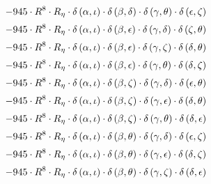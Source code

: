 \begin{subequations}
\begin{gather}
 \\[0.2em] \notag 		 - 945 \cdot R^{8} \cdot R_{\eta{}} \cdot \delta{}\left(\alpha{}, \iota{}\right) \cdot \delta{}\left(\beta{}, \delta{}\right) \cdot \delta{}\left(\gamma{}, \theta{}\right) \cdot \delta{}\left(\epsilon{}, \zeta{}\right) 
 \\[0.2em] \notag 		 - 945 \cdot R^{8} \cdot R_{\eta{}} \cdot \delta{}\left(\alpha{}, \iota{}\right) \cdot \delta{}\left(\beta{}, \epsilon{}\right) \cdot \delta{}\left(\gamma{}, \delta{}\right) \cdot \delta{}\left(\zeta{}, \theta{}\right) 
 \\[0.2em] \notag 		 - 945 \cdot R^{8} \cdot R_{\eta{}} \cdot \delta{}\left(\alpha{}, \iota{}\right) \cdot \delta{}\left(\beta{}, \epsilon{}\right) \cdot \delta{}\left(\gamma{}, \zeta{}\right) \cdot \delta{}\left(\delta{}, \theta{}\right) 
 \\[0.2em] \notag 		 - 945 \cdot R^{8} \cdot R_{\eta{}} \cdot \delta{}\left(\alpha{}, \iota{}\right) \cdot \delta{}\left(\beta{}, \epsilon{}\right) \cdot \delta{}\left(\gamma{}, \theta{}\right) \cdot \delta{}\left(\delta{}, \zeta{}\right) 
 \\[0.2em] \notag 		 - 945 \cdot R^{8} \cdot R_{\eta{}} \cdot \delta{}\left(\alpha{}, \iota{}\right) \cdot \delta{}\left(\beta{}, \zeta{}\right) \cdot \delta{}\left(\gamma{}, \delta{}\right) \cdot \delta{}\left(\epsilon{}, \theta{}\right) 
 \\[0.2em] \notag 		 - 945 \cdot R^{8} \cdot R_{\eta{}} \cdot \delta{}\left(\alpha{}, \iota{}\right) \cdot \delta{}\left(\beta{}, \zeta{}\right) \cdot \delta{}\left(\gamma{}, \epsilon{}\right) \cdot \delta{}\left(\delta{}, \theta{}\right) 
 \\[0.2em] \notag 		 - 945 \cdot R^{8} \cdot R_{\eta{}} \cdot \delta{}\left(\alpha{}, \iota{}\right) \cdot \delta{}\left(\beta{}, \zeta{}\right) \cdot \delta{}\left(\gamma{}, \theta{}\right) \cdot \delta{}\left(\delta{}, \epsilon{}\right) 
 \\[0.2em] \notag 		 - 945 \cdot R^{8} \cdot R_{\eta{}} \cdot \delta{}\left(\alpha{}, \iota{}\right) \cdot \delta{}\left(\beta{}, \theta{}\right) \cdot \delta{}\left(\gamma{}, \delta{}\right) \cdot \delta{}\left(\epsilon{}, \zeta{}\right) 
 \\[0.2em] \notag 		 - 945 \cdot R^{8} \cdot R_{\eta{}} \cdot \delta{}\left(\alpha{}, \iota{}\right) \cdot \delta{}\left(\beta{}, \theta{}\right) \cdot \delta{}\left(\gamma{}, \epsilon{}\right) \cdot \delta{}\left(\delta{}, \zeta{}\right) 
 \\[0.2em] \notag 		 - 945 \cdot R^{8} \cdot R_{\eta{}} \cdot \delta{}\left(\alpha{}, \iota{}\right) \cdot \delta{}\left(\beta{}, \theta{}\right) \cdot \delta{}\left(\gamma{}, \zeta{}\right) \cdot \delta{}\left(\delta{}, \epsilon{}\right) 

\end{gather}
\end{subequations}
